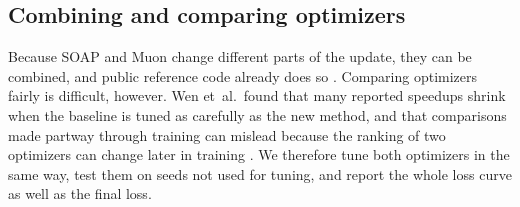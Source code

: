 \subsection{Combining and comparing optimizers}

Because SOAP and Muon change different parts of the update, they can be
combined, and public reference code already does so \cite{vyas_soapmuon_code}.
Comparing optimizers fairly is difficult, however. Wen et~al.\ found that many
reported speedups shrink when the baseline is tuned as carefully as the new
method, and that comparisons made partway through training can mislead because
the ranking of two optimizers can change later in training
\cite{wen2025fantastic}. We therefore tune both optimizers in the same way, test
them on seeds not used for tuning, and report the whole loss curve as well as
the final loss.
